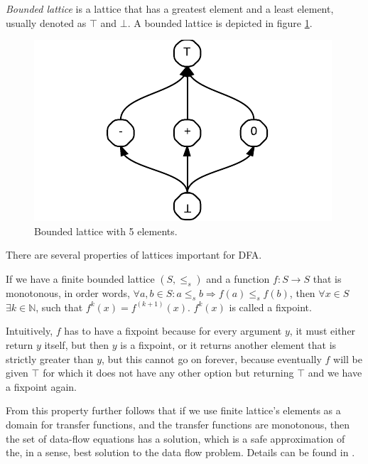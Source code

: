         \emph{Bounded lattice} is a lattice that has 
        a greatest element and a least element, 
        usually denoted as $\top$ and $\bot$. 
        A bounded lattice is depicted in figure \ref{lattice}.       
        
\begin{figure}[h]  
  \centering
    \includegraphics{img/lattice.pdf}
  \caption{Bounded lattice with 5 elements.\label{lattice}}    
\end{figure}

        There are several properties of lattices important for DFA.
        
        If we have a finite bounded lattice $(S, \leq_{s})$ and a function 
        $f:S\rightarrow{S}$ that is monotonous, in order words, 
        $\forall{a,b\in{S}}: a\leq_s{b} \Rightarrow f(a)\leq_s{f(b)}$, 
        then $\forall{x\in{S}}$ $\exists{k\in\mathbb{N}}$, such that 
        $f^k(x)=f^{(k+1)}(x)$. $f^k(x)$ is called a fixpoint.
        
        Intuitively, $f$ has to have a fixpoint because 
        for every argument $y$, it must either return 
        $y$ itself, but then $y$ is a fixpoint, or it 
        returns another element that is strictly 
        greater than $y$, but this cannot go on forever, because eventually 
        $f$ will be given $\top$ for which it does not have 
        any other option but returning $\top$ and we 
        have a fixpoint again.
        
        From this property further follows that if we use finite 
        lattice's elements as a domain for transfer functions, 
        and the transfer functions are monotonous, then the set of 
        data-flow equations has a solution, which is a safe 
        approximation of the, in a sense, best solution to the 
        data flow problem. Details can be found in \cite{kildall1973unified}.
        

